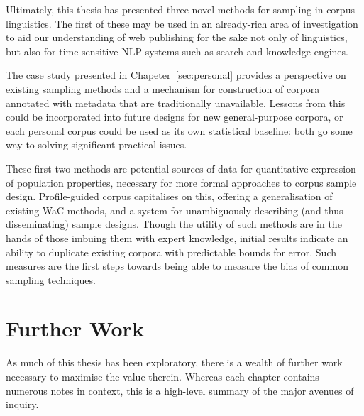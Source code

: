 Ultimately, this thesis has presented three novel methods for sampling in corpus linguistics.  The first of these may be used in an already-rich area of investigation to aid our understanding of web publishing for the sake not only of linguistics, but also for time-sensitive NLP systems such as search and knowledge engines.

The case study presented in Chapeter~\ref{sec:personal} provides a perspective on existing sampling methods and a mechanism for construction of corpora annotated with metadata that are traditionally unavailable.  Lessons from this could be incorporated into future designs for new general-purpose corpora, or each personal corpus could be used as its own statistical baseline: both go some way to solving significant practical issues.

These first two methods are potential sources of data for quantitative expression of population properties, necessary for more formal approaches to corpus sample design.  Profile-guided corpus capitalises on this, offering a generalisation of existing WaC methods, and a system for unambiguously describing (and thus disseminating) sample designs.  Though the utility of such methods are in the hands of those imbuing them with expert knowledge, initial results indicate an ability to duplicate existing corpora with predictable bounds for error.  Such measures are the first steps towards being able to measure the bias of common sampling techniques.








\section{Further Work}
As much of this thesis has been exploratory, there is a wealth of further work necessary to maximise the value therein.  Whereas each chapter contains numerous notes in context, this is a high-level summary of the major avenues of inquiry.



